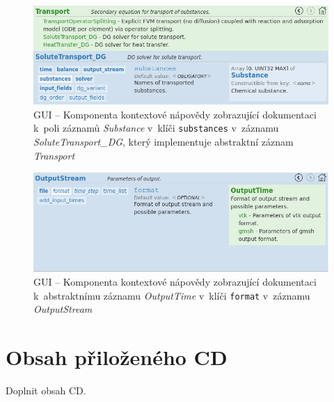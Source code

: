 \documentclass[FM,bw,DP]{tulthesis}
\begin{document}
\begin{figure}[h!]
	\centering
    \includegraphics[width=\textwidth]{../img/screenshots/gui_doc_substances.png}
    \caption[GUI -- Kontextová nápověda pro záznam \textit{SoluteTransport\_DG}]{GUI -- Komponenta kontextové nápovědy zobrazující dokumentaci k~poli záznamů \textit{Substance} v~klíči \texttt{substances} v~záznamu \textit{SoluteTransport\_DG}, který implementuje abstraktní záznam \textit{Transport}}
	\label{img:gui_doc_substances}
\end{figure}

\begin{figure}[h!]
	\centering
    \includegraphics[width=\textwidth]{../img/screenshots/gui_doc_format.png}
    \caption[GUI -- Kontextová nápověda pro záznam \textit{OutputStream}]{GUI -- Komponenta kontextové nápovědy zobrazující dokumentaci k~abstraktnímu záznamu \textit{OutputTime} v~klíči \texttt{format} v~záznamu \textit{OutputStream}}
	\label{img:gui_doc_format}
\end{figure}

\clearpage

\chapter{Obsah přiloženého CD}


Doplnit obsah CD.
\end{document}
